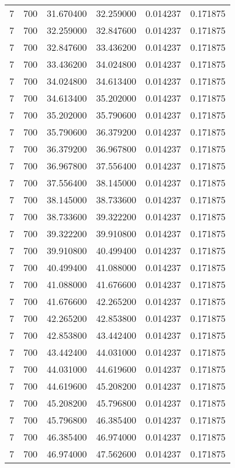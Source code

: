 \begin{longtable}{rrrrrr}
7 & 700 & 31.670400 & 32.259000 & 0.014237 & 0.171875 \\
7 & 700 & 32.259000 & 32.847600 & 0.014237 & 0.171875 \\
7 & 700 & 32.847600 & 33.436200 & 0.014237 & 0.171875 \\
7 & 700 & 33.436200 & 34.024800 & 0.014237 & 0.171875 \\
7 & 700 & 34.024800 & 34.613400 & 0.014237 & 0.171875 \\
7 & 700 & 34.613400 & 35.202000 & 0.014237 & 0.171875 \\
7 & 700 & 35.202000 & 35.790600 & 0.014237 & 0.171875 \\
7 & 700 & 35.790600 & 36.379200 & 0.014237 & 0.171875 \\
7 & 700 & 36.379200 & 36.967800 & 0.014237 & 0.171875 \\
7 & 700 & 36.967800 & 37.556400 & 0.014237 & 0.171875 \\
7 & 700 & 37.556400 & 38.145000 & 0.014237 & 0.171875 \\
7 & 700 & 38.145000 & 38.733600 & 0.014237 & 0.171875 \\
7 & 700 & 38.733600 & 39.322200 & 0.014237 & 0.171875 \\
7 & 700 & 39.322200 & 39.910800 & 0.014237 & 0.171875 \\
7 & 700 & 39.910800 & 40.499400 & 0.014237 & 0.171875 \\
7 & 700 & 40.499400 & 41.088000 & 0.014237 & 0.171875 \\
7 & 700 & 41.088000 & 41.676600 & 0.014237 & 0.171875 \\
7 & 700 & 41.676600 & 42.265200 & 0.014237 & 0.171875 \\
7 & 700 & 42.265200 & 42.853800 & 0.014237 & 0.171875 \\
7 & 700 & 42.853800 & 43.442400 & 0.014237 & 0.171875 \\
7 & 700 & 43.442400 & 44.031000 & 0.014237 & 0.171875 \\
7 & 700 & 44.031000 & 44.619600 & 0.014237 & 0.171875 \\
7 & 700 & 44.619600 & 45.208200 & 0.014237 & 0.171875 \\
7 & 700 & 45.208200 & 45.796800 & 0.014237 & 0.171875 \\
7 & 700 & 45.796800 & 46.385400 & 0.014237 & 0.171875 \\
7 & 700 & 46.385400 & 46.974000 & 0.014237 & 0.171875 \\
7 & 700 & 46.974000 & 47.562600 & 0.014237 & 0.171875 \\

\end{longtable}
